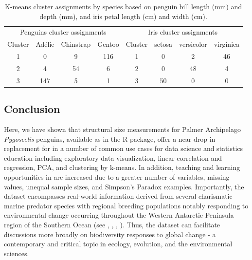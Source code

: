 \begin{Schunk}
\begin{table}

\caption{\label{tab:unnamed-chunk-5}K-means cluster assignments by species based on penguin bill length (mm) and depth (mm), and iris petal length (cm) and width (cm).}
\centering
\begin{tabular}[t]{cccccccc}
\toprule
\multicolumn{4}{c}{Penguins cluster assignments} & \multicolumn{4}{c}{Iris cluster assignments} \\
\cmidrule(l{3pt}r{3pt}){1-4} \cmidrule(l{3pt}r{3pt}){5-8}
Cluster & Adélie & Chinstrap & Gentoo & Cluster & setosa & versicolor & virginica\\
\midrule
1 & 0 & 9 & 116 & 1 & 0 & 2 & 46\\
2 & 4 & 54 & 6 & 2 & 0 & 48 & 4\\
3 & 147 & 5 & 1 & 3 & 50 & 0 & 0\\
\bottomrule
\end{tabular}
\end{table}

\end{Schunk}

\hypertarget{conclusion}{%
\subsection{Conclusion}\label{conclusion}}

Here, we have shown that structural size measurements for Palmer
Archipelago \emph{Pygoscelis} penguins, available as  in
the  R package, offer a near drop-in replacement for
 in a number of common use cases for data science and
statistics education including exploratory data visualization, linear
correlation and regression, PCA, and clustering by k-means. In addition,
teaching and learning opportunities in  are increased due
to a greater number of variables, missing values, unequal sample sizes,
and Simpson's Paradox examples. Importantly, the  dataset
encompasses real-world information derived from several charismatic
marine predator species with regional breeding populations notably
responding to environmental change occurring throughout the Western
Antarctic Peninsula region of the Southern Ocean (see
\citet{bestelmeyer_analysis_2011}, \citet{gorman_ecological_2014},
\citet{gorman_population_2017}, \citet{gorman_advancing_2021}). Thus,
the  dataset can facilitate discussions more broadly on
biodiversity responses to global change - a contemporary and critical
topic in ecology, evolution, and the environmental sciences.

